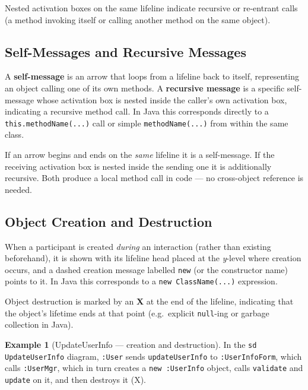 \documentclass[11pt, a4paper, notitlepage]{report}
\theoremstyle{definition}
\theoremstyle{remark}
\theoremstyle{definition}
\newtheorem{example}[theorem]{Example}
\begin{document}
Nested activation boxes on the same lifeline indicate recursive or re-entrant
calls (a method invoking itself or calling another method on the same object).

\subsection{Self-Messages and Recursive Messages}
\label{subsec:ch7-self-recursive}

A \textbf{self-message} is an arrow that loops from a lifeline back to itself,
representing an object calling one of its own methods. A \textbf{recursive
message} is a specific self-message whose activation box is nested inside the
caller's own activation box, indicating a recursive method call. In Java this
corresponds directly to a \texttt{this.methodName(...)} call or simple
\texttt{methodName(...)} from within the same class.

\begin{examtip}[title={Exam Tip: Identifying Self-Messages}]
If an arrow begins and ends on the \emph{same} lifeline it is a self-message.
If the receiving activation box is nested inside the sending one it is
additionally recursive. Both produce a local method call in code --- no
cross-object reference is needed.
\end{examtip}

\subsection{Object Creation and Destruction}
\label{subsec:ch7-create-destroy}

When a participant is created \emph{during} an interaction (rather than
existing beforehand), it is shown with its lifeline head placed at the
\emph{y}-level where creation occurs, and a dashed creation message labelled
\texttt{new} (or the constructor name) points to it. In Java this corresponds
to a \texttt{new ClassName(...)} expression.

Object destruction is marked by an \textbf{X} at the end of the lifeline,
indicating that the object's lifetime ends at that point (e.g.\ explicit
\texttt{null}-ing or garbage collection in Java).

\begin{example}[UpdateUserInfo — creation and destruction]
\label{ex:ch7-create-destroy}
In the \texttt{sd UpdateUserInfo} diagram, \texttt{:User} sends
\texttt{updateUserInfo} to \texttt{:UserInfoForm}, which calls
\texttt{:UserMgr}, which in turn creates a \texttt{new :UserInfo} object,
calls \texttt{validate} and \texttt{update} on it, and then destroys it (X).
\end{example}
\end{document}
